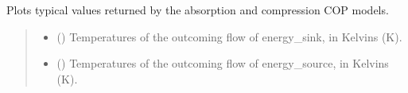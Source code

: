 \documentclass[letterpaper,10pt,english]{sphinxmanual}
\begin{document}
\begin{fulllineitems}
\begin{fulllineitems}
\label{\detokenize{generated/tamos.production.COPModels:tamos.production.COPModels.plot}}
\pysigstartsignatures
{}
\pysigstopsignatures
\sphinxAtStartPar
Plots typical values returned by the absorption and compression COP models.
\begin{quote}\begin{description}
\begin{itemize}
\item {} 
\sphinxAtStartPar
{} (\sphinxstyleliteralemphasis{\sphinxupquote{, }}\sphinxstyleliteralemphasis{\sphinxupquote{, }}\sphinxstyleliteralemphasis{\sphinxupquote{(}}\sphinxstyleliteralemphasis{\sphinxupquote{, }}\sphinxstyleliteralemphasis{\sphinxupquote{, }}\sphinxstyleliteralemphasis{\sphinxupquote{)}}) \textendash{} Temperatures of the outcoming flow of energy\_sink, in Kelvins (K).

\item {} 
\sphinxAtStartPar
{} (\sphinxstyleliteralemphasis{\sphinxupquote{, }}\sphinxstyleliteralemphasis{\sphinxupquote{, }}\sphinxstyleliteralemphasis{\sphinxupquote{(}}\sphinxstyleliteralemphasis{\sphinxupquote{, }}\sphinxstyleliteralemphasis{\sphinxupquote{, }}\sphinxstyleliteralemphasis{\sphinxupquote{)}}) \textendash{} Temperatures of the outcoming flow of energy\_source, in Kelvins (K).


\end{itemize}
\end{description}
\end{quote}
\end{fulllineitems}
\end{fulllineitems}
\end{document}
